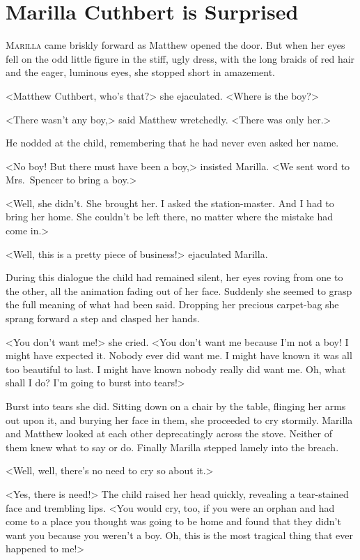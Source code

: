 \chapter{Marilla Cuthbert is Surprised}

\lettrine[]{M}{arilla} came briskly forward as Matthew opened the door. But when her eyes fell on the odd little figure in the stiff, ugly dress, with the long braids of red hair and the eager, luminous eyes, she stopped short in amazement.

<Matthew Cuthbert, who's that?> she ejaculated. <Where is the boy?>

<There wasn't any boy,> said Matthew wretchedly. <There was only her.>

He nodded at the child, remembering that he had never even asked her name.

<No boy! But there must have been a boy,> insisted Marilla. <We sent word to Mrs.~Spencer to bring a boy.>

<Well, she didn't. She brought her. I asked the station-master. And I had to bring her home. She couldn't be left there, no matter where the mistake had come in.>

<Well, this is a pretty piece of business!> ejaculated Marilla.

During this dialogue the child had remained silent, her eyes roving from one to the other, all the animation fading out of her face. Suddenly she seemed to grasp the full meaning of what had been said. Dropping her precious carpet-bag she sprang forward a step and clasped her hands.

<You don't want me!> she cried. <You don't want me because I'm not a boy! I might have expected it. Nobody ever did want me. I might have known it was all too beautiful to last. I might have known nobody really did want me. Oh, what shall I do? I'm going to burst into tears!>

Burst into tears she did. Sitting down on a chair by the table, flinging her arms out upon it, and burying her face in them, she proceeded to cry stormily. Marilla and Matthew looked at each other deprecatingly across the stove. Neither of them knew what to say or do. Finally Marilla stepped lamely into the breach.

<Well, well, there's no need to cry so about it.>

<Yes, there is need!> The child raised her head quickly, revealing a tear-stained face and trembling lips. <You would cry, too, if you were an orphan and had come to a place you thought was going to be home and found that they didn't want you because you weren't a boy. Oh, this is the most tragical thing that ever happened to me!>

